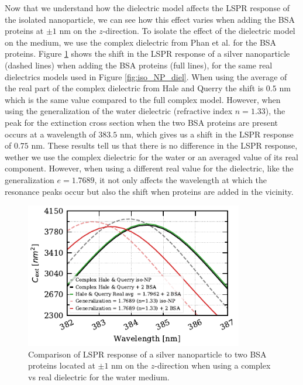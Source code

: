 Now that we understand how the dielectric model affects the LSPR response of the isolated nanoparticle, we can see how this 
effect varies when adding the BSA proteins at $\pm1$ nm on the $z$-direction. To isolate the effect of the dielectric model on the 
medium, we use the complex dielectric from Phan et al. \cite{PhanETal2013} for the BSA proteins. Figure \ref{fig:real_w_comp_bsa}
shows the shift in the LSPR response of a silver nanoparticle (dashed lines) when adding the BSA proteins (full lines), for the same 
real dielectrics models used in Figure \ref{fig:iso_NP_diel}. When using the average of the real part of the complex dielectric from 
Hale and Querry \cite{HaleQuerry1972} the shift is $0.5$ nm which is the same value compared to the full complex model. However, when using 
the generalization of the water dielectric (refractive index $n=1.33$), the peak for the extinction cross section when the two BSA proteins are
present occurs at a wavelength of $383.5$ nm, which gives us a shift in the LSPR response of $0.75$ nm. These results tell us that there is no 
difference in the LSPR response, wether we use the complex dielectric for the water or an averaged value of its real component. However, when using a
different real value for the dielectric, like the generalization $e=1.7689$, it not only affects the wavelength at which the resonance peaks occur
but also the shift when proteins are added in the vicinity. 

 \begin{figure} %
    \centering
    \includegraphics[width=0.85\textwidth]{bsa_w_real_water_diel.pdf} 
    \caption{Comparison of LSPR response of a silver nanoparticle to two BSA proteins located at $\pm1$ nm on the $z$-direction
    when using a complex vs real dielectric for the water medium.}
    \label{fig:real_w_comp_bsa}
 \end{figure}

